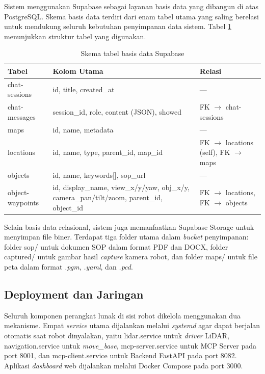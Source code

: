 Sistem menggunakan Supabase sebagai layanan basis data yang dibangun di atas PostgreSQL. Skema basis data terdiri dari enam tabel utama yang saling berelasi untuk mendukung seluruh kebutuhan penyimpanan data sistem. Tabel \ref{tab:db-schema} menunjukkan struktur tabel yang digunakan.

\begin{table}[H]
\centering
\caption{Skema tabel basis data Supabase}
\label{tab:db-schema}
\begin{tabular}{|l|p{5cm}|p{5cm}|}
\hline
\textbf{Tabel} & \textbf{Kolom Utama} & \textbf{Relasi} \\ \hline
chat-sessions & id, title, created\_at & — \\ \hline
chat-messages & session\_id, role, content (JSON), showed & FK $\rightarrow$ chat-sessions \\ \hline
maps & id, name, metadata & — \\ \hline
locations & id, name, type, parent\_id, map\_id & FK $\rightarrow$ locations (self), FK $\rightarrow$ maps \\ \hline
objects & id, name, keywords[], sop\_url & — \\ \hline
object-waypoints & id, display\_name, view\_x/y/yaw, obj\_x/y, camera\_pan/tilt/zoom, parent\_id, object\_id & FK $\rightarrow$ locations, FK $\rightarrow$ objects \\ \hline
\end{tabular}
\end{table}

Selain basis data relasional, sistem juga memanfaatkan Supabase Storage untuk menyimpan file biner. Terdapat tiga folder utama dalam \textit{bucket} penyimpanan: folder sop/ untuk dokumen SOP dalam format PDF dan DOCX, folder captured/ untuk gambar hasil \textit{capture} kamera robot, dan folder maps/ untuk file peta dalam format \textit{.pgm}, \textit{.yaml}, dan \textit{.pcd}.


\subsection{Deployment dan Jaringan}

Seluruh komponen perangkat lunak di sisi robot dikelola menggunakan dua mekanisme. Empat \textit{service} utama dijalankan melalui \textit{systemd} agar dapat berjalan otomatis saat robot dinyalakan, yaitu lidar.service untuk \textit{driver} LiDAR, navigation.service untuk \textit{move\_base}, mcp-server.service untuk MCP Server pada port 8001, dan mcp-client.service untuk Backend FastAPI pada port 8082. Aplikasi \textit{dashboard} web dijalankan melalui Docker Compose pada port 3000.

